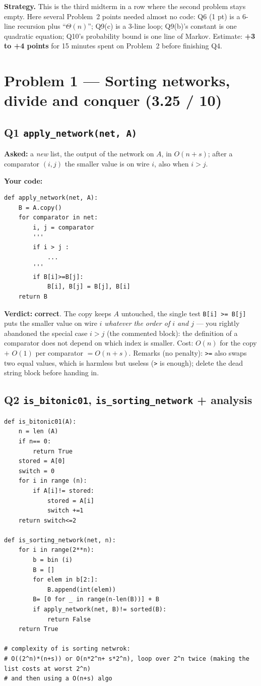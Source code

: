 \documentclass[11pt,a4paper]{article}
\newcommand{\pts}[3]{\fcolorbox{#3}{white}{\color{#3}\textbf{#1\,/\,#2}}}
\newcommand{\OK}{\textcolor{ok}{\textbf{correct}}}
\begin{document}
\textbf{Strategy.} This is the third midterm in a row where the second problem stays empty. Here
several Problem~2 points needed almost no code: Q6 (1 pt) is a 6-line recursion plus
``$\Theta(n)$''; Q9(c) is a 3-line loop; Q9(b)'s constant is one quadratic equation; Q10's
probability bound is one line of Markov. Estimate: \textbf{+3 to +4 points} for 15 minutes spent
on Problem~2 before finishing Q4.

\newpage
\section{Problem 1 --- Sorting networks, divide and conquer (3.25 / 10)}

\subsection*{Q1 \quad \texttt{apply\_network(net, A)} \hfill \pts{1}{1}{ok}}
\textbf{Asked:} a \emph{new} list, the output of the network on $A$, in $O(n+s)$; after a
comparator $(i,j)$ the smaller value is on wire $i$, also when $i>j$.

\textbf{Your code:}
\begin{lstlisting}
def apply_network(net, A):
    B = A.copy()
    for comparator in net:
        i, j = comparator
        '''
        if i > j :
            ...
        '''
        if B[i]>=B[j]:
            B[i], B[j] = B[j], B[i]
    return B
\end{lstlisting}
\textbf{Verdict:} \OK. The copy keeps $A$ untouched, the single test \texttt{B[i] >= B[j]} puts
the smaller value on wire $i$ \emph{whatever the order of $i$ and $j$} --- you rightly abandoned the
special case $i>j$ (the commented block): the definition of a comparator does not depend on which
index is smaller. Cost: $O(n)$ for the copy $+$ $O(1)$ per comparator $=O(n+s)$.
Remarks (no penalty): \texttt{>=} also swaps two equal values, which is harmless but useless
(\texttt{>} is enough); delete the dead string block before handing in.

\subsection*{Q2 \quad \texttt{is\_bitonic01}, \texttt{is\_sorting\_network} + analysis \hfill \pts{1.25}{2}{part}}
\begin{lstlisting}
def is_bitonic01(A):
    n = len (A)
    if n== 0:
        return True
    stored = A[0]
    switch = 0
    for i in range (n):
        if A[i]!= stored:
            stored = A[i]
            switch +=1
    return switch<=2

def is_sorting_network(net, n):
    for i in range(2**n):
        b = bin (i)
        B = []
        for elem in b[2:]:
            B.append(int(elem))
        B= [0 for _ in range(n-len(B))] + B
        if apply_network(net, B)!= sorted(B):
            return False
    return True

# complexity of is sorting netwrok:
# O((2^n)*(n+s)) or O(n*2^n+ s*2^n), loop over 2^n twice (making the list costs at worst 2^n)
# and then using a O(n+s) algo
\end{lstlisting}
\end{document}
